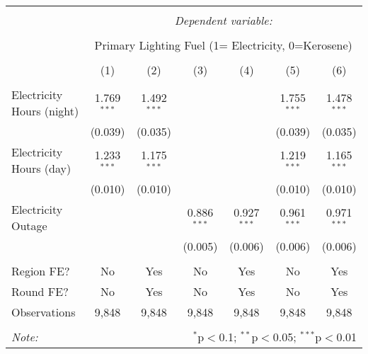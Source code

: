 
\begin{tabular}{@{\extracolsep{5pt}}lcccccc} 
\\[-1.8ex]\hline 
\hline \\[-1.8ex] 
 & \multicolumn{6}{c}{\textit{Dependent variable:}} \\ 
\cline{2-7} 
\\[-1.8ex] & \multicolumn{6}{c}{Primary Lighting Fuel (1= Electricity, 0=Kerosene)} \\ 
\\[-1.8ex] & (1) & (2) & (3) & (4) & (5) & (6)\\ 
\hline \\[-1.8ex] 
 Electricity Hours (night) & 1.769$^{***}$ & 1.492$^{***}$ &  &  & 1.755$^{***}$ & 1.478$^{***}$ \\ 
  & (0.039) & (0.035) &  &  & (0.039) & (0.035) \\ 
  Electricity Hours (day) & 1.233$^{***}$ & 1.175$^{***}$ &  &  & 1.219$^{***}$ & 1.165$^{***}$ \\ 
  & (0.010) & (0.010) &  &  & (0.010) & (0.010) \\ 
  Electricity Outage &  &  & 0.886$^{***}$  & 0.927$^{***}$ & 0.961$^{***}$ & 0.971$^{***}$ \\ 
  &  &  & (0.005)  & (0.006) & (0.006) & (0.006) \\ 
 \hline \\[-1.8ex] 
Region FE? & No & Yes & No & Yes & No & Yes \\ 
Round FE? & No & Yes & No & Yes & No & Yes \\ 
Observations & 9,848 & 9,848 & 9,848 & 9,848 & 9,848 & 9,848 \\ 
\hline 
\hline \\[-1.8ex] 
\textit{Note:}  & \multicolumn{6}{r}{$^{*}$p$<$0.1; $^{**}$p$<$0.05; $^{***}$p$<$0.01} \\ 
\end{tabular} 
